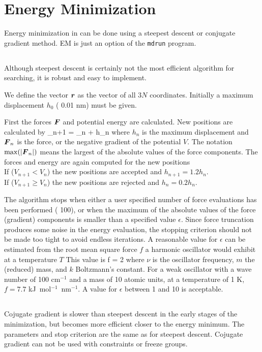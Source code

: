 \section{Energy Minimization}
\label{sec:EM}
Energy minimization in {\gromacs} can be done using 
a steepest descent or conjugate gradient method.
EM is just an option of the {\tt mdrun} program.

\subsection{}
Although steepest descent is certainly not the most efficient
algorithm for searching, it is robust and easy to implement.

We define the vector $\mbox{\boldmath ${r}$}$ as the vector of all $3N$ coordinates.
Initially a maximum displacement $h_0$ ({\eg} 0.01 nm) must be given. 

First the forces $\mbox{\boldmath ${F}$}$ and potential energy are calculated.
New positions are calculated by
\beq
{}_{n+1} =  _n +  h_n
\eeq
where $h_n$ is the maximum displacement and $\mbox{\boldmath ${F}$}_n$ is the force,
or the negative gradient of the  potential $V$. The notation $\max
(|\mbox{\boldmath ${F}$}_n|)$ means the largest of the absolute values of the force
components.  The forces and energy are again computed for the new positions \\
If ($V_{n+1} < V_n$) the new positions are accepted and $h_{n+1} = 1.2
h_n$. \\
If ($V_{n+1} \geq V_n$) the new positions are rejected and $h_n = 0.2 h_n$.

The algorithm stops when either a user specified number of force 
evaluations has been performed ({\eg} 100), or when the maximum of the absolute
values of the force (gradient) components is smaller than a specified
value $\epsilon$.
Since force truncation produces some noise in the
energy evaluation, the stopping criterion should not be made too tight
to avoid endless iterations. A reasonable value for $\epsilon$ can be
estimated from the root mean square force $f$ a harmonic oscillator would exhibit at a
temperature $T$ This value is 
\beq
  f = 2 \pi \nu {}
\eeq
where $\nu$ is the oscillator frequency, $m$ the (reduced) mass, and
$k$ Boltzmann's constant. For a weak oscillator with a wave number of
100 cm$^{-1}$ and a mass of 10 atomic units, at a temperature of 1 K,
$f=7.7$ kJ~mol$^{-1}$~nm$^{-1}$. A value for $\epsilon$ between 1 and
10 is acceptable.   

\subsection{}
Cojugate gradient is slower than steepest descent in the early stages of
the minimization, but becomes more efficient closer to the energy minimum.
The parameters and stop criterion are the same as for steepest descent.
Cojugate gradient can not be used with constraints or freeze groups.

